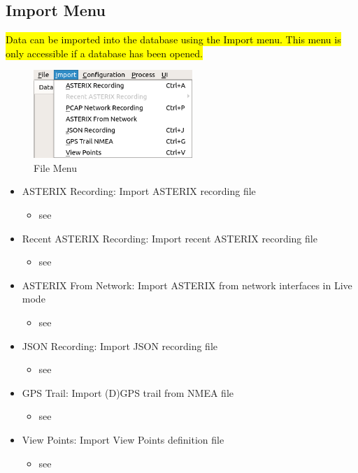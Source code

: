 \subsection{Import Menu}
\label{sec:ui_overview_import_menu}

\hl{Data can be imported into the database using the Import menu. This menu is only accessible if a database has been opened.}

\begin{figure}[H]
  \center
    \includegraphics[width=6cm,frame]{figures/ui_import_menu.png}
  \caption{File Menu}
\end{figure}

\begin{itemize}
 \item ASTERIX Recording: Import ASTERIX recording file
 \begin{itemize}
 \item see 
 \end{itemize}
 \item Recent ASTERIX Recording: Import recent ASTERIX recording file
  \begin{itemize}
 \item see 
 \end{itemize}
 \item ASTERIX From Network: Import ASTERIX from network interfaces in Live mode
  \begin{itemize}
 \item see 
 \end{itemize}
 \item JSON Recording: Import JSON recording file
  \begin{itemize}
 \item see 
 \end{itemize}
 \item GPS Trail: Import (D)GPS trail from NMEA file
  \begin{itemize}
 \item see 
 \end{itemize}
 \item View Points: Import View Points definition file
  \begin{itemize}
 \item see 
 \end{itemize}
\end{itemize}
\  \\

